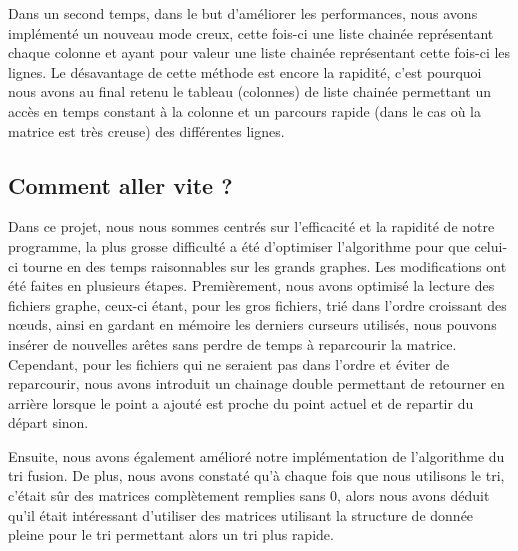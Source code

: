 \documentclass{NewTeX}
\begin{document}
Dans un second temps, dans le but d'améliorer les performances, nous avons implémenté un nouveau mode creux, cette fois-ci une liste chainée représentant chaque colonne et ayant pour valeur une liste chainée représentant cette fois-ci les lignes. Le désavantage de cette méthode est encore la rapidité, c'est pourquoi nous avons au final retenu le tableau (colonnes) de liste chainée permettant un accès en temps constant à la colonne et un parcours rapide (dans le cas où la matrice est très creuse) des différentes lignes.


\subsection{Comment aller vite ?}

Dans ce projet, nous nous sommes centrés sur l'efficacité et la rapidité de notre programme, la plus grosse difficulté a été d'optimiser l'algorithme pour que celui-ci tourne en des temps raisonnables sur les grands graphes. Les modifications ont été faites en plusieurs étapes. Premièrement, nous avons optimisé la lecture des fichiers graphe, ceux-ci étant, pour les gros fichiers, trié dans l'ordre croissant des nœuds, ainsi en gardant en mémoire les derniers curseurs utilisés, nous pouvons insérer de nouvelles arêtes sans perdre de temps à reparcourir la matrice. Cependant, pour les fichiers qui ne seraient pas dans l'ordre et éviter de reparcourir, nous avons introduit un chainage double permettant de retourner en arrière lorsque le point a ajouté est proche du point actuel et de repartir du départ sinon.

Ensuite, nous avons également amélioré notre implémentation de l'algorithme du tri fusion. De plus, nous avons constaté qu'à chaque fois que nous utilisons le tri, c'était sûr des matrices complètement remplies sans 0, alors nous avons déduit qu'il était intéressant d'utiliser des matrices utilisant la structure de donnée pleine pour le tri permettant alors un tri plus rapide.
\end{document}
